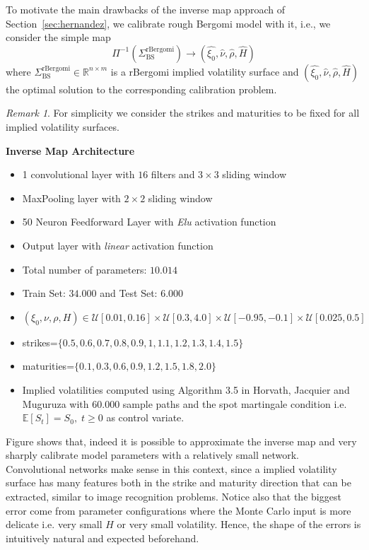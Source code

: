 \documentclass{article}
\theoremstyle{remark}
\newtheorem{remark}{Remark}
\begin{document}
To motivate the main drawbacks of the inverse map approach of
Section~\ref{sec:hernandez}, we calibrate rough Bergomi model with it, i.e., we consider
the simple map
\begin{equation*}
  \Pi^{-1}(\Sigma^{\mathrm{rBergomi}}_{\mathrm{BS}})\to (\hat{\xi_0},\hat{\nu},\hat{\rho},\hat{H})
\end{equation*}
where $\Sigma^{\mathrm{rBergomi}}_{\mathrm{BS}} \in\mathbb{R}^{n\times m}$ is
a rBergomi implied volatility surface and $
(\hat{\xi_0},\hat{\nu},\hat{\rho},\hat{H})$ the optimal solution to the
corresponding calibration problem.

\begin{remark}
  For simplicity we consider the strikes and maturities to be fixed for all
  implied volatility surfaces.
\end{remark}

\textbf{Inverse Map Architecture}
\begin{itemize}
\item 1 convolutional layer with $16$ filters and $3\times3$ sliding window
\item MaxPooling layer with $2\times 2$ sliding window
\item 50 Neuron Feedforward Layer with \textit{Elu} activation function
\item Output layer with \textit{linear} activation function
\item Total number of parameters: $10.014$
\item Train Set: $34.000$ and Test Set: $6.000$
\item $(\xi_0,\nu,\rho,H)\in \mathcal{U}[0.01,0.16]\times
  \mathcal{U}[0.3,4.0]\times \mathcal{U}[-0.95,-0.1]\times
  \mathcal{U}[0.025,0.5]$ 
\item strikes=$\{0.5,0.6,0.7,0.8,0.9,1,1.1,1.2,1.3,1.4,1.5\}$
\item maturities=$\{0.1,0.3,0.6,0.9,1.2,1.5,1.8,2.0 \}$
\item Implied volatilities computed using Algorithm 3.5 in Horvath, Jacquier and
  Muguruza \cite{HJM17} with $60.000$ sample paths and the spot martingale
  condition i.e. $\mathbb{E}[S_t]=S_0,\;t\geq 0$ as control variate. 
\end{itemize}


Figure  shows that, indeed it is possible to approximate the
inverse map and very sharply calibrate model parameters with a relatively
small network. Convolutional networks make sense in this context, since a
implied volatility surface has many features both in the strike and maturity
direction that can be extracted, similar to image recognition problems. Notice
also that the biggest error come from parameter configurations where the Monte
Carlo input is more delicate i.e. very small $H$ or very small
volatility. Hence, the shape of the errors is intuitively natural and expected
beforehand.
\end{document}
